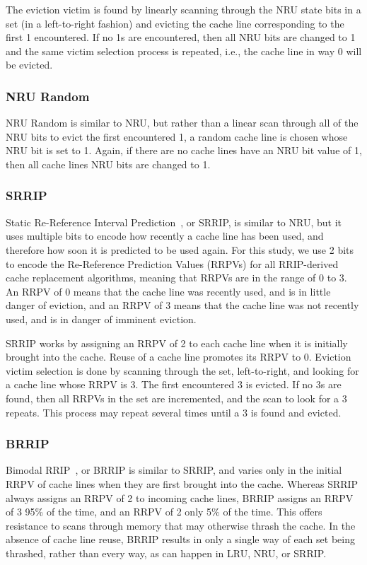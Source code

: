 {The eviction victim is found by linearly scanning through the NRU state bits in a set (in a left-to-right fashion) and evicting the cache line corresponding to the first 1 encountered.  If no 1s are encountered, then all NRU bits are changed to 1 and the same victim selection process is repeated, i.e., the cache line in way 0 will be evicted.

\subsubsection{NRU Random}

NRU Random is similar to NRU, but rather than a linear scan through all of the NRU bits to evict the first encountered 1, a random cache line is chosen whose NRU bit is set to 1.  Again, if there are no cache lines have an NRU bit value of 1, then all cache lines NRU bits are changed to 1.
}
\subsubsection{SRRIP}

Static Re-Reference Interval Prediction~\cite{jaleeltheobald10}, or SRRIP, is similar to NRU, but it uses multiple bits to encode how recently a cache line has been used, and therefore how soon it is predicted to be used again.  For this study, we use 2 bits to encode the Re-Reference Prediction Values (RRPVs) for all RRIP-derived cache replacement algorithms, meaning that RRPVs are in the range of 0 to 3.  An RRPV of 0 means that the cache line was recently used, and is in little danger of eviction, and an RRPV of 3 means that the cache line was not recently used, and is in danger of imminent eviction.

SRRIP works by assigning an RRPV of 2 to each cache line when it is initially brought into the cache.  Reuse of a cache line promotes its RRPV to 0.  Eviction victim selection is done by scanning through the set, left-to-right, and looking for a cache line whose RRPV is 3.  The first encountered 3 is evicted.  If no 3s are found, then all RRPVs in the set are incremented, and the scan to look for a 3 repeats.  This process may repeat several times until a 3 is found and evicted.

\subsubsection{BRRIP}

Bimodal RRIP~\cite{jaleeltheobald10}, or BRRIP is similar to SRRIP, and varies only in the initial RRPV of cache lines when they are first brought into the cache.  Whereas SRRIP always assigns an RRPV of 2 to incoming cache lines, BRRIP assigns an RRPV of 3 95\% of the time, and an RRPV of 2 only 5\% of the time.  This offers resistance to scans through memory that may otherwise thrash the cache.  In the absence of cache line reuse, BRRIP results in only a single way of each set being thrashed, rather than every way, as can happen in LRU, NRU, or SRRIP.


